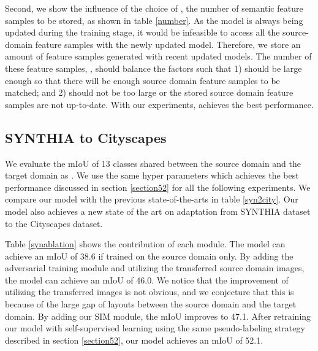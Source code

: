 \documentclass[10pt,twocolumn,letterpaper]{article}
\begin{document}
Second, we show the influence of the choice of , the number of semantic feature samples to be stored, as shown in table \ref{number}. As the model is always being updated during the training stage, it would be infeasible to access all the source-domain feature samples with the newly updated model. Therefore, we store an amount of feature samples generated with recent updated models. The number of these feature samples, , should balance the factors such that 1)  should be large enough so that there will be enough source domain feature samples to be matched; and 2)  should not be too large or the stored source domain feature samples are not up-to-date. With our experiments,  achieves the best performance. 


\vspace{-2mm}
\subsection{SYNTHIA to Cityscapes}
\vspace{-2mm}
We evaluate the mIoU of 13 classes shared between the source domain and the target domain as \cite{Luo_2019_CVPR, outputspace,Du_2019_ICCV,bidir}.
We use the same hyper parameters which achieves the best performance discussed in section \ref{section52} for all the following experiments.
We compare our model with the previous state-of-the-arts in table \ref{syn2city}. Our model also achieves a new state of the art on adaptation from SYNTHIA dataset to the Cityscapes dataset. 

Table \ref{synablation} shows the contribution of each module.
The model can achieve an mIoU of 38.6 if trained on the source domain only. By adding the adversarial training module and utilizing the transferred source domain images, the model can achieve an mIoU of 46.0. We notice that the improvement of utilizing the transferred images is not obvious, and we conjecture that this is because of the large gap of layouts between the source domain and the target domain. By adding our SIM module, the mIoU improves to 47.1. After retraining our model with self-supervised learning using the same pseudo-labeling strategy described in section \ref{section52}, our model achieves an mIoU of 52.1.



\vspace{-2mm}
\end{document}
